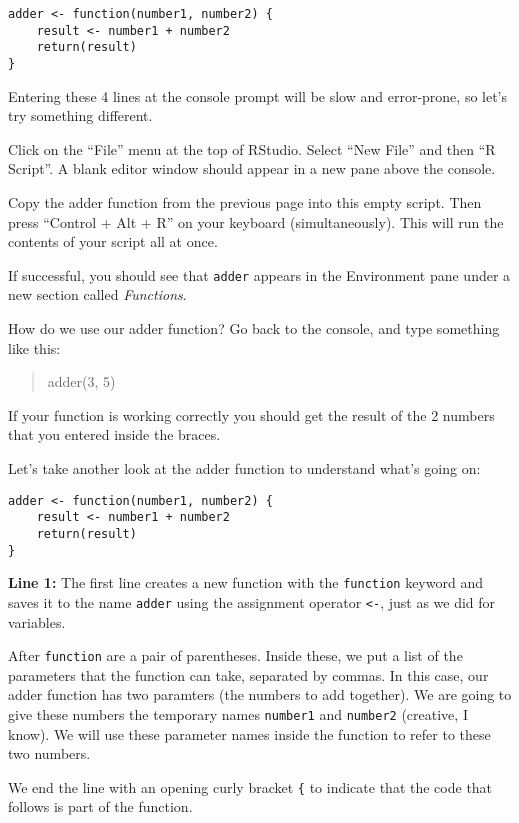 \documentclass[
]{article}
\theoremstyle{definition}
\theoremstyle{definition}
\theoremstyle{definition}
\theoremstyle{definition}
\theoremstyle{remark}
\begin{document}
\begin{verbatim}
adder <- function(number1, number2) {
    result <- number1 + number2
    return(result)
}
\end{verbatim}

Entering these 4 lines at the console prompt will be slow and error-prone, so let's try something different.

Click on the ``File'' menu at the top of RStudio. Select ``New File'' and then ``R Script''. A blank editor window should appear in a new pane above the console.

Copy the adder function from the previous page into this empty script. Then press ``Control + Alt + R'' on your keyboard (simultaneously). This will run the contents of your script all at once.

If successful, you should see that \texttt{adder} appears in the Environment pane under a new section called \emph{Functions}.

How do we use our adder function? Go back to the console, and type something like this:

\begin{quote}
adder(3, 5)
\end{quote}

If your function is working correctly you should get the result of the 2 numbers that you entered inside the braces.

Let's take another look at the adder function to understand what's going on:

\begin{verbatim}
adder <- function(number1, number2) {
    result <- number1 + number2
    return(result)
}
\end{verbatim}

\textbf{Line 1:} The first line creates a new function with the \texttt{function} keyword and saves it to the name \texttt{adder} using the assignment operator \texttt{\textless{}-}, just as we did for variables.

After \texttt{function} are a pair of parentheses. Inside these, we put a list of the parameters that the function can take, separated by commas. In this case, our adder function has two paramters (the numbers to add together). We are going to give these numbers the temporary names \texttt{number1} and \texttt{number2} (creative, I know). We will use these parameter names inside the function to refer to these two numbers.

We end the line with an opening curly bracket \texttt{\{} to indicate that the code that follows is part of the function.
\end{document}
